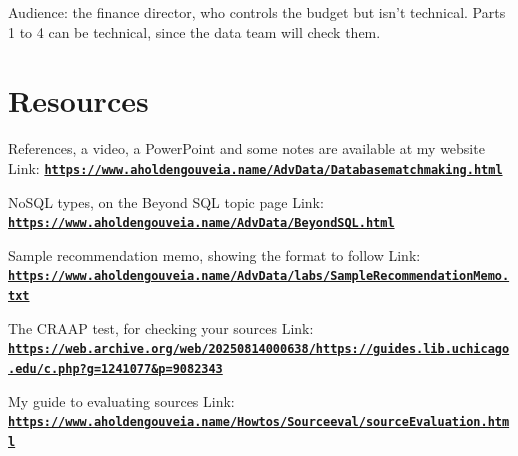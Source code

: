 \documentclass[12pt]{article}
\begin{document}
Audience: the finance director, who controls the budget but isn't technical. Parts 1 to 4 can be technical, since the data team will check them.

\section*{Resources}
References, a video, a PowerPoint and some notes are available at my website
Link: \href{https://www.aholdengouveia.name/AdvData/Databasematchmaking.html}{\textbf{\nolinkurl{https://www.aholdengouveia.name/AdvData/Databasematchmaking.html}}}

NoSQL types, on the Beyond SQL topic page
Link: \href{https://www.aholdengouveia.name/AdvData/BeyondSQL.html}{\textbf{\nolinkurl{https://www.aholdengouveia.name/AdvData/BeyondSQL.html}}}

Sample recommendation memo, showing the format to follow
Link: \href{https://www.aholdengouveia.name/AdvData/labs/SampleRecommendationMemo.txt}{\textbf{\nolinkurl{https://www.aholdengouveia.name/AdvData/labs/SampleRecommendationMemo.txt}}}

The CRAAP test, for checking your sources
Link: \href{https://web.archive.org/web/20250814000638/https://guides.lib.uchicago.edu/c.php?g=1241077&p=9082343}{\textbf{\nolinkurl{https://web.archive.org/web/20250814000638/https://guides.lib.uchicago.edu/c.php?g=1241077&p=9082343}}}

My guide to evaluating sources
Link: \href{https://www.aholdengouveia.name/Howtos/Sourceeval/sourceEvaluation.html}{\textbf{\nolinkurl{https://www.aholdengouveia.name/Howtos/Sourceeval/sourceEvaluation.html}}}
\end{document}

